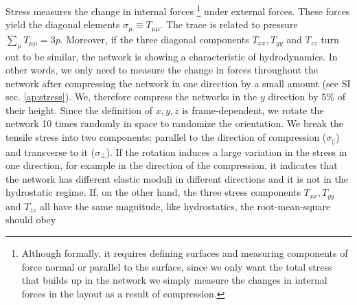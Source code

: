 \documentclass[nofootinbib,preprint,floatfix,endfloats]{revtex4} %
\begin{document}
Stress measures the change in internal forces
\footnote{Although formally, it requires defining surfaces and measuring components of force normal or parallel to the surface, since we only want the total stress that builds up in the network we simply measure the changes in internal forces in the layout as a result of compression.} under external forces.
These forces yield 
the  diagonal elements $ \sigma_\mu \equiv T_{\mu\mu}$. 
The trace  is related to pressure $\sum_\mu T_{\mu\mu} = 3p$. 
Moreover, if the three diagonal  components $T_{xx}, T_{yy}$ and $T_{zz}$ turn out to be similar, the network is showing a characteristic of hydrodynamics.
In other words, we only need to measure the change in forces throughout the network after compressing the network in one direction by a small amount (see SI sec. \ref{ap:stress}). 
We, therefore compress the networks in the $y$ direction by $5\%$ 
of their height. 
Since the definition of $x,y,z$ is frame-dependent, we rotate the network 10 times randomly in space to randomize the orientation. 
We break the tensile stress into two components: parallel to the direction of compression ($\sigma_\parallel$) and transverse to it ($\sigma_\perp$). 
If the rotation induces a large variation in the stress in one direction, for example in the direction of the compression, it indicates that the network has different elastic moduli in different directions and it is not in the hydrostatic regime. 
If, on the other hand, the three stress components $T_{xx}, T_{yy}$ and $T_{zz}$ all have the same magnitude, like hydrostatics, the root-mean-square should obey
\end{document}
